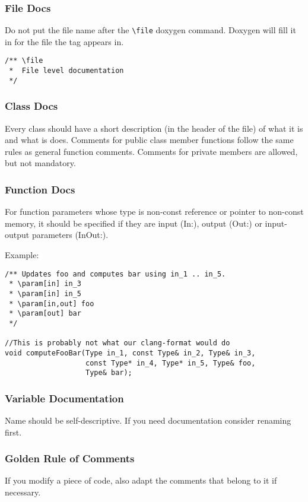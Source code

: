 \subsubsection{File Docs}
Do not put the file name after the \verb|\file| doxygen command. Doxygen will fill it in for the file the tag appears in.
\begin{lstlisting}
/** \file
 *  File level documentation 
 */
\end{lstlisting}

\subsubsection{Class Docs}
Every class should have a short description (in the header of the file) of what it is and what is does.
Comments for public class member functions follow the same rules as general function comments.
Comments for private members are allowed, but not mandatory.

\subsubsection{Function Docs}
For function parameters whose type is non-const reference or pointer to non-const memory,
it should be specified if they are input (In:), output (Out:) or input-output parameters (InOut:).

Example:
\begin{lstlisting}
/** Updates foo and computes bar using in_1 .. in_5.
 * \param[in] in_3
 * \param[in] in_5
 * \param[in,out] foo
 * \param[out] bar
 */

//This is probably not what our clang-format would do
void computeFooBar(Type in_1, const Type& in_2, Type& in_3,
                   const Type* in_4, Type* in_5, Type& foo,
                   Type& bar);
\end{lstlisting}

\subsubsection{Variable Documentation}
Name should be self-descriptive.  If you need documentation consider renaming first.

\subsubsection{Golden Rule of Comments}
If you modify a piece of code, also adapt the comments that belong to it if necessary.

